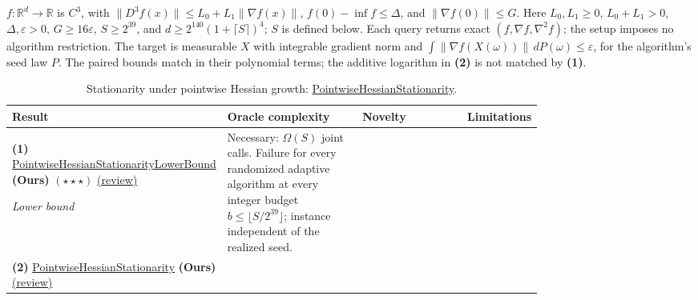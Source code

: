 \begin{table}[tp]
\centering
\caption{Stationarity under pointwise Hessian growth: \href{https://github.com/k3nfalt/longtails/blob/main/LongTails/Setups/PointwiseHessianStationarity.lean}{PointwiseHessianStationarity}.}\label{tab:PointwiseHessianStationarity}
\parbox{\linewidth}{\footnotesize
$f:\mathbb{R}^d\to\mathbb{R}$ is $C^3$, with $\|D^3f(x)\|\le L_0+L_1\|\nabla f(x)\|$, $f(0)-\inf f\le\Delta$, and $\|\nabla f(0)\|\le G$.
Here $L_0,L_1\ge0$, $L_0+L_1>0$, $\Delta,\varepsilon>0$, $G\ge16\varepsilon$, $S\ge2^{39}$, and $d\ge2^{140}(1+\lceil S\rceil)^4$; $S$ is defined below.
Each query returns exact $(f,\nabla f,\nabla^2f)$; the setup imposes no algorithm restriction. The target is measurable $X$ with integrable gradient norm and $\int\|\nabla f(X(\omega))\|\,dP(\omega)\le\varepsilon$, for the algorithm's seed law $P$.
The paired bounds match in their polynomial terms; the additive logarithm in \textbf{(2)} is not matched by \textbf{(1)}.
}\par\smallskip
\begin{threeparttable}
\footnotesize
\setlength{\tabcolsep}{4pt}\renewcommand{\arraystretch}{1.25}
\begin{tabularx}{\linewidth}{@{}>{\raggedright\arraybackslash}p{0.20\linewidth}>{\raggedright\arraybackslash}p{0.32\linewidth}>{\raggedright\arraybackslash}p{0.25\linewidth}>{\raggedright\arraybackslash}X@{}}
\toprule
\textbf{Result} & \textbf{Oracle complexity} & \textbf{Novelty} & \textbf{Limitations} \\
\midrule
\textbf{(1)} \href{https://github.com/k3nfalt/longtails/blob/main/LongTails/Theorems/PointwiseHessianStationarityLowerBound.lean}{Pointwise\allowbreak Hessian\allowbreak Stationarity\allowbreak Lower\allowbreak Bound} \textbf{(Ours)} $(\star\star\star)$ \href{https://github.com/k3nfalt/longtails/blob/main/scripts/reviews/PointwiseHessianStationarityLowerBound.md}{(review)}\par
\textit{Lower bound}
& Necessary: $\Omega(S)$ joint calls. Failure for every randomized adaptive algorithm at every integer budget $b\le\lfloor S/2^{39}\rfloor$; instance independent of the realized seed.
& & \\
\midrule
\textbf{(2)} \href{https://github.com/k3nfalt/longtails/blob/main/LongTails/Theorems/PointwiseHessianStationarity.lean}{Pointwise\allowbreak Hessian\allowbreak Stationarity} \textbf{(Ours)} \href{https://github.com/k3nfalt/longtails/blob/main/scripts/reviews/PointwiseHessianStationarity.md}{(review)}\par

\end{tabularx}
\end{threeparttable}
\end{table}
